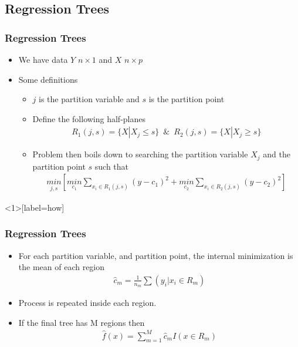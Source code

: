 \documentclass[
  shownotes,
  xcolor={svgnames},
  hyperref={colorlinks,citecolor=DarkBlue,linkcolor=DarkRed,urlcolor=DarkBlue}
  ]{beamer}
\begin{document}
\subsection{Regression Trees}
\begin{frame}[fragile]
\frametitle{Regression Trees}

\begin{itemize}
\item We have data $Y$ $n\times 1$ and $X$ $n\times p$
\item Some definitions
\begin{itemize}
\item $j$ is the partition variable and $s$ is the partition point
\item Define the following half-planes
\begin{align}
R_1(j,s)=\{X|X_j\leq s\} \,\,\, \& \,\,\, R_2(j,s)=\{X|X_j\geq s\}
\end{align}
\item Problem then boils down to searching the partition variable $X_j$ and the partition point $s$ such that
\begin{align}
\underset{j,s}{min} \left[ \underset{c_1}{min}\sum_{x_i\in R_1(j,s)}(y-c_1)^2+ \underset{c_2}{min}\sum_{x_i\in R_2(j,s)}(y-c_2)^2\right]
\end{align}
\end{itemize}
\end{itemize}
\end{frame}
\begin{frame}<1>[label=how]
\frametitle{Regression Trees}

\begin{itemize}
\item For each partition variable, and partition point, the internal minimization is the mean of each region
\begin{align}
 \hat{c}_m =\frac{1}{n_m} \sum(y_i|x_i \in R_m)
\end{align}
\item Process is repeated inside each region. 
\pause
\item If the final tree has M regions then 
\begin{align}
\hat{f}(x) = \sum_{m=1}^M \hat{c}_m I(x \in R_m)
\end{align}

\end{itemize}

\end{frame}
\end{document}

